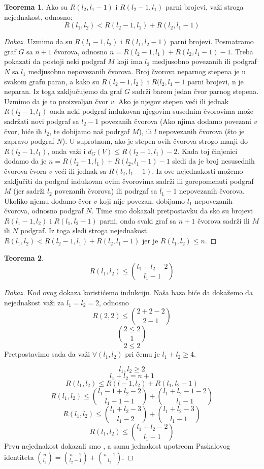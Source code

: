 \documentclass{article}
\theoremstyle{definition}
\newtheorem{teorema}{Teorema}[section]
\newcommand{\dokaz}[1]{\begin{proof}[Dokaz]#1\end{proof}}
\begin{document}
	\begin{teorema}
	Ako su $R(l_2, l_1-1)$ i $R(l_2-1, l_1)$ parni brojevi, važi stroga nejednakost, odnosno: 
	\[
	R(l_1,l_2) < R(l_2-1, l_1) + R(l_2, l_1-1)
	\]
	\end{teorema}
	\dokaz{
	Uzmimo da su $R(l_1-1, l_2)$ i $R(l_1, l_2-1)$ parni brojevi. Posmatramo graf $G$ sa $n+1$ čvorova, odnosno $n=R(l_2-1, l_1)+ R(l_2, l_1-1)-1$.
	Treba pokazati da postoji neki podgraf $M$ koji ima $l_2$ medjusobno povezanih ili podgraf $N$ sa $l_1$ medjusobno nepovezanih čvorova. Broj čvorova neparnog stepena je u svakom grafu paran, a kako su $R(l_2-1, l_2)$ i $R(l_2, l_1-1$ parni brojevi, n je neparan. Iz toga zaključujemo da graf $G$ sadrži barem jedan čvor parnog stepena. Uzmimo da je to proizvoljan čvor $v$. Ako je njegov stepen veći ili jednak $R(l_2-1,l_1)$ onda neki podgraf indukovan njegovim susednim čvorovima može sadržati novi podgraf sa $l_2-1$ povezanih čvorova (Ako njima dodamo povezani $v$ čvor, biće ih $l_2$, te dobijamo naš podrgaf $M$), ili $l$ nepovezanih čvorova (što je zapravo podgraf $N$). 
	\newline
	U suprotnom, ako je stepen ovih čvorova strogo manji do $R(l_2-1,l_1)$, onda važi i $d_G(V) \leq R(l_2-1, l_1)-2$. Kada toj činjenici dodamo da je $n=R(l_2-1, l_1)+ R(l_2, l_1-1)-1$ sledi da je broj nesusednih čvorova čvora $v$ veći ili jednak sa $R(l_2, l_1-1)$. Iz ove nejednakosti možemo zaključiti da podgraf indukovan ovim čvorovima sadrži ili gorepomenuti podgraf $M$ (jer sadrži $l_2$ povezanih čvorova) ili podrgaf sa $l_1-1$ nepovezanih čvorova. Ukoliko njemu dodamo čvor $v$ koji nije povezan, dobijamo $l_1$ nepovezanih čvorova, odnosno podgraf $N$.
	\newline
	Time smo dokazali pretpostavku da sko su brojevi $R(l_1-1, l_2)$ i $R(l_1, l_2-1)$ parni, onda svaki graf sa $n+1$ čvorova sadrži ili $M$ ili $N$ podgraf. Iz toga sledi stroga nejednakost $R(l_1,l_2) < R(l_2-1, l_1) + R(l_2, l_1-1)$ jer je $R(l_1,l_2) \leq n$. 
	}
 
	


		\begin{teorema}
	\[R(l_1,l_2) \leq {l_1+l_2-2\choose l_1-1} 
	\]
	\end{teorema}
	\dokaz{
	Kod ovog dokaza koristićemo indukciju. Naša baza biće da dokažemo da nejednakost važi za $l_1=l_2=2$, odnosno
	\[ R(2,2) \leq {2+2-2 \choose 2-1}
	\]
	\[
	2 \leq 2 \choose 1
	\]
	\[
	2 \leq 2
	\]
	Pretpostavimo sada da važi $\forall(l_1,l_2)$  pri čemu je $l_1+l_2 \geq 4$.

	\[l_1,l_2 \geq 2
	\]
	\[
	l_1+l_2=n+1
	\]
	\[
	R(l_1,l_2) \leq R(l-1, l_2) + R(l_1, l_2-1)
	\]
	\[
	R(l_1,l_2) \leq {{l_1-1+l_2-2 \choose l_1-1-1} + {l_1+l_2-1-2 \choose l_1-1}}
	\]
	\[
	R(l_1,l_2) \leq {{l_1+l_2-3 \choose l_1-2} + {l_1+l_2-3 \choose l_1-1}}
	\]
	\[
	R(l_1,l_2) \leq {l_1+l_2-2 \choose l_1-1}
	\]
	Prvu nejednakost dokazali smo %
	, a samu jednakost upotreom Paskalovog identiteta ${n \choose l_2} = {n-1 \choose l_2-1} + {n-1 \choose l_2}$.
}
	
\end{document}
